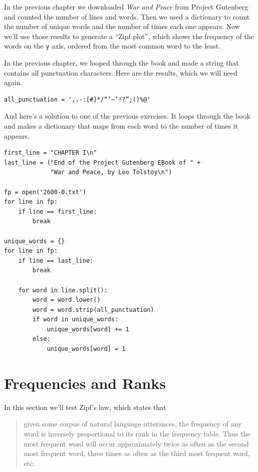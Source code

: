In the previous chapter we downloaded \emph{War and Peace} from Project
Gutenberg and counted the number of lines and words. Then we used a
dictionary to count the number of unique words and the number of times
each one appears. Now we'll use those results to generate a ``Zipf
plot'', which shows the frequency of the words on the
\passthrough{\lstinline!y!} axis, ordered from the most common word to
the least.

In the previous chapter, we looped through the book and made a string
that contains all punctuation characters. Here are the results, which we
will need again.

\begin{lstlisting}[]
all_punctuation = ',.-:[#]*/“’—‘!?”;()%@'
\end{lstlisting}

And here's a solution to one of the previous exercises. It loops through
the book and makes a dictionary that maps from each word to the number
of times it appears.

\begin{lstlisting}[]
first_line = "CHAPTER I\n"
last_line = ("End of the Project Gutenberg EBook of " +
             "War and Peace, by Leo Tolstoy\n")

fp = open('2600-0.txt')
for line in fp:
    if line == first_line:
        break

unique_words = {}
for line in fp:
    if line == last_line:
        break
        
    for word in line.split():
        word = word.lower()
        word = word.strip(all_punctuation)
        if word in unique_words:
            unique_words[word] += 1
        else:
            unique_words[word] = 1
\end{lstlisting}

\hypertarget{frequencies-and-ranks}{%
\section{Frequencies and Ranks}\label{frequencies-and-ranks}}

In this section we'll test Zipf's law, which states that

\begin{quote}
given some corpus of natural language utterances, the frequency of any
word is inversely proportional to its rank in the frequency table. Thus
the most frequent word will occur approximately twice as often as the
second most frequent word, three times as often as the third most
frequent word, etc.
\end{quote}

